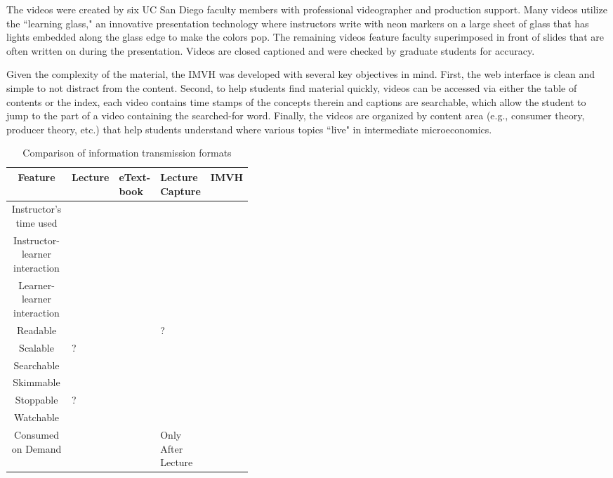 \documentclass[12pt]{article}
\begin{document}
The videos were created by six UC San Diego faculty members with professional videographer and production support. Many videos utilize the ``learning glass," an innovative presentation technology where instructors write with neon markers on a large sheet of glass that has lights embedded along the glass edge to make the colors pop. The remaining videos feature faculty superimposed in front of slides that are often written on during the presentation. Videos are closed captioned and were checked by graduate students for accuracy.

Given the complexity of the material, the IMVH was developed with several key objectives in mind. First, the web interface is clean and simple to not distract from the content. Second, to help students find material quickly, videos can be accessed via either the table of contents or the index, each video contains time stamps of the concepts therein and captions are searchable, which allow the student to jump to the part of a video containing the searched-for word. Finally, the videos are organized by content area (e.g., consumer theory, producer theory, etc.) that help students understand where various topics ``live" in intermediate microeconomics.



\begin{table}
	\caption{Comparison of information transmission formats} \label{tech_comparison}
	\centering
	\begin{tabular}{|c*{4}{|>{\centering\arraybackslash}m{0.1\linewidth}}|}
		\hline
		Feature & Lecture & eText-book & Lecture Capture & IMVH\\
		\hline
		Instructor's time used & \checkmark & & &\\
		Instructor-learner interaction & \checkmark & & &\\
		Learner-learner interaction & \checkmark & & & \\
		Readable & & \checkmark & ? & \checkmark \\
		Scalable & ? & \checkmark & \checkmark & \checkmark \\
		Searchable & & \checkmark & & \checkmark \\
		Skimmable & & \checkmark & & \checkmark \\
		Stoppable & ? & \checkmark & \checkmark & \checkmark \\
		Watchable & \checkmark & & \checkmark & \checkmark \\
		Consumed on Demand & & \checkmark & Only After Lecture &\checkmark \\
		\hline

	\end{tabular}
	\label{infotransmission}
\end{table}
\end{document}
